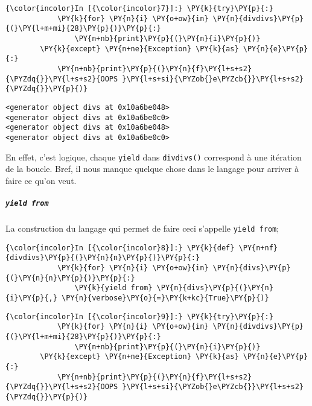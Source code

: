     \begin{Verbatim}[commandchars=\\\{\},frame=single,framerule=0.3mm,rulecolor=\color{cellframecolor}]
{\color{incolor}In [{\color{incolor}7}]:} \PY{k}{try}\PY{p}{:}
            \PY{k}{for} \PY{n}{i} \PY{o+ow}{in} \PY{n}{divdivs}\PY{p}{(}\PY{l+m+mi}{28}\PY{p}{)}\PY{p}{:}
                \PY{n+nb}{print}\PY{p}{(}\PY{n}{i}\PY{p}{)}
        \PY{k}{except} \PY{n+ne}{Exception} \PY{k}{as} \PY{n}{e}\PY{p}{:}
            \PY{n+nb}{print}\PY{p}{(}\PY{n}{f}\PY{l+s+s2}{\PYZdq{}}\PY{l+s+s2}{OOPS }\PY{l+s+si}{\PYZob{}e\PYZcb{}}\PY{l+s+s2}{\PYZdq{}}\PY{p}{)}
\end{Verbatim}


    \begin{Verbatim}[commandchars=\\\{\},frame=single,framerule=0.3mm,rulecolor=\color{cellframecolor}]
<generator object divs at 0x10a6be048>
<generator object divs at 0x10a6be0c0>
<generator object divs at 0x10a6be048>
<generator object divs at 0x10a6be0c0>
\end{Verbatim}

    En effet, c'est logique, chaque \texttt{yield} dans \texttt{divdivs()}
correspond à une itération de la boucle. Bref, il nous manque quelque
chose dans le langage pour arriver à faire ce qu'on veut.

    \hypertarget{yield-from}{%
\subparagraph{\texorpdfstring{\texttt{yield\ from}}{yield from}}\label{yield-from}}

    La construction du langage qui permet de faire ceci s'appelle
\texttt{yield\ from};

    \begin{Verbatim}[commandchars=\\\{\},frame=single,framerule=0.3mm,rulecolor=\color{cellframecolor}]
{\color{incolor}In [{\color{incolor}8}]:} \PY{k}{def} \PY{n+nf}{divdivs}\PY{p}{(}\PY{n}{n}\PY{p}{)}\PY{p}{:}
            \PY{k}{for} \PY{n}{i} \PY{o+ow}{in} \PY{n}{divs}\PY{p}{(}\PY{n}{n}\PY{p}{)}\PY{p}{:}
                \PY{k}{yield from} \PY{n}{divs}\PY{p}{(}\PY{n}{i}\PY{p}{,} \PY{n}{verbose}\PY{o}{=}\PY{k+kc}{True}\PY{p}{)}
\end{Verbatim}


    \begin{Verbatim}[commandchars=\\\{\},frame=single,framerule=0.3mm,rulecolor=\color{cellframecolor}]
{\color{incolor}In [{\color{incolor}9}]:} \PY{k}{try}\PY{p}{:}
            \PY{k}{for} \PY{n}{i} \PY{o+ow}{in} \PY{n}{divdivs}\PY{p}{(}\PY{l+m+mi}{28}\PY{p}{)}\PY{p}{:}
                \PY{n+nb}{print}\PY{p}{(}\PY{n}{i}\PY{p}{)}
        \PY{k}{except} \PY{n+ne}{Exception} \PY{k}{as} \PY{n}{e}\PY{p}{:}
            \PY{n+nb}{print}\PY{p}{(}\PY{n}{f}\PY{l+s+s2}{\PYZdq{}}\PY{l+s+s2}{OOPS }\PY{l+s+si}{\PYZob{}e\PYZcb{}}\PY{l+s+s2}{\PYZdq{}}\PY{p}{)}
\end{Verbatim}


